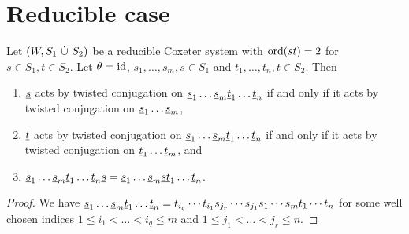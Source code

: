 \section{Reducible case}
\label{sec:3rc-reducible-case}

\begin{lemm}
	Let $(W, S_1 \ \dot \cup \  S_2)$ be a reducible Coxeter system with $\operatorname{ord}(st) = 2$ for $s \in S_1, t \in S_2$. Let $\theta = \operatorname{id}$, $s_1,\ldots,s_m,s \in S_1$ and $t_1,\ldots,t_n,t \in S_2$. Then

	\begin{enumerate}
		\item $\underline{s}$ acts by twisted conjugation on $\underline{s}_1 \ldots \underline{s}_m \underline{t}_1 \ldots \underline{t}_n$ if and only if it acts by twisted conjugation on $\underline{s}_1 \ldots \underline{s}_m$,
		\item $\underline{t}$ acts by twisted conjugation on $\underline{s}_1 \ldots \underline{s}_m \underline{t}_1 \ldots \underline{t}_n$ if and only if it acts by twisted conjugation on $\underline{t}_1 \ldots \underline{t}_m$, and
		\item $\underline{s}_1 \ldots \underline{s}_m \underline{t}_1 \ldots \underline{t}_n \underline{s} = \underline{s}_1 \ldots \underline{s}_m \underline{s} \underline{t}_1 \ldots \underline{t}_n$.
	\end{enumerate}

	\begin{proof}
		We have $\underline{s}_1 \ldots \underline{s}_m \underline{t}_1 \ldots \underline{t}_n = t_{i_q} \cdots t_{i_1} s_{j_r} \cdots s_{j_1} s_1 \cdots s_m t_1 \cdots t_n$ for some well chosen indices $1 \leq i_1 < \ldots < i_q \leq m$ and $1 \leq j_1 < \ldots < j_r \leq n$.


\end{proof}
\end{lemm}
